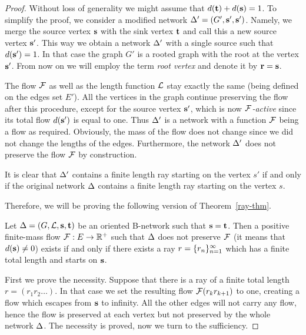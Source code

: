 \documentclass[12pt,oneside,a4paper]{amsart}
\begin{document}
    \begin{proof}
      Without loss of generality we might assume that $d(\mathbf{t}) + d(\mathbf{s}) = 1$.
      To simplify the proof, we consider a modified network $\Delta' = (G', \mathbf{s}', \mathbf{s}')$.
      Namely, we merge the source vertex $\mathbf{s}$ with the sink vertex $\mathbf{t}$ and call this a new source vertex $\mathbf{s}'$.
      This way we obtain a network $\Delta'$ with a single source such that $d(\mathbf{s}') = 1$.
      In that case the graph $G'$ is a rooted graph with the root at the vertex $\mathbf{s}'$.
      From now on we will employ the term \emph{root vertex} and denote it by $\mathbf{r} = \mathbf{s}$.

      The flow $\mathcal{F}$ as well as the length function $\mathcal{L}$ stay exactly the same (being defined on the edges set $E'$).
      All the vertices in the graph continue preserving the flow after this procedure, except for the source vertex $\mathbf{s}'$,
        which is now \emph{$\mathcal{F}$-active} since its total flow $d(\mathbf{s}')$ is equal to one.
      Thus $\Delta'$ is a network with a function $\mathcal{F}$ being a flow as required.
      Obviously, the mass of the flow does not change since we did not change the lengths of the edges.
      Furthermore, the network $\Delta'$ does not preserve the flow $\mathcal{F}$ by construction.

      It is clear that $\Delta'$ contains a finite length ray starting on the vertex $s'$ if and only if the original network $\Delta$ contains a finite
        length ray starting on the vertex $s$.

      Therefore, we will be proving the following version of Theorem~\ref{ray-thm}.
      \begin{theorem*}
        Let $\Delta = (G, \mathcal{L}, \mathbf{s}, \mathbf{t})$ be an oriented B-network such that $\mathbf{s} = \mathbf{t}$.
        Then a positive finite-mass flow $\mathcal{F}: E \to \mathbb{R}^{+}$ such that
          $\Delta$ does not preserve $\mathcal{F}$ (it means that $d(\mathbf{s}) \neq 0$)
          exists if and only if there exists a ray $r = \{{r}_n\}_{n=1}^\infty$ which has a finite total length and starts on $\mathbf{s}$.
      \end{theorem*}
      First we prove the necessity.
      Suppose that there is a ray of a finite total length $r=(r_1 r_2 \dots)$.
      In that case we set the resulting flow $\mathcal{F}(r_k r_{k+1})$ to one, creating a flow which escapes
        from $\mathbf{s}$ to infinity.
      All the other edges will not carry any flow, hence the flow is preserved
        at each vertex but not preserved by the whole network $\Delta$.
      The necessity is proved, now we turn to the sufficiency.


\end{proof}
\end{document}
